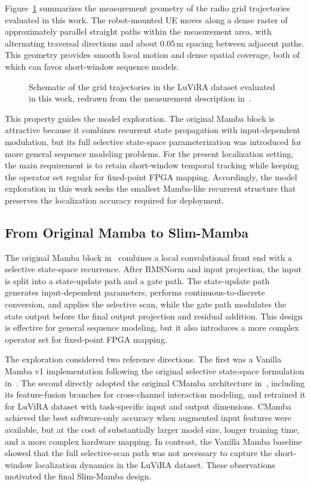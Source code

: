 \documentclass[lettersize,journal]{IEEEtran}
\begin{document}
Figure~\ref{fig:luvira_grid_scenario} summarizes the measurement geometry of
the radio grid trajectories evaluated in this work. The robot-mounted UE moves
along a dense raster of approximately parallel straight paths within the
measurement area, with alternating traversal directions and about 0.05\,m
spacing between adjacent paths. This geometry provides smooth local motion and
dense spatial coverage, both of which can favor short-window sequence models.

\begin{figure}[!t]
  \centering
  
  \caption{Schematic of the grid trajectories in the LuViRA dataset evaluated in this work, redrawn from the measurement description in~\cite{LuViRA2024, Tian2024}.}
  \label{fig:luvira_grid_scenario}
\end{figure}

This property guides the model exploration. The original Mamba block is
attractive because it combines recurrent state propagation with input-dependent modulation, but its full selective state-space parameterization was introduced for more general sequence modeling problems. For the present localization setting, the main requirement is to retain short-window temporal tracking while keeping the operator set regular for fixed-point FPGA mapping. Accordingly, the model exploration in this work seeks the smallest Mamba-like recurrent structure that preserves the localization accuracy required for deployment.

\subsection{From Original Mamba to Slim-Mamba}

The original Mamba block in~\cite{Mamba2023} combines a local convolutional
front end with a selective state-space recurrence. After RMSNorm and input
projection, the input is split into a state-update path and a gate path. The
state-update path generates input-dependent parameters, performs
continuous-to-discrete conversion, and applies the selective scan, while the
gate path modulates the state output before the final output projection and
residual addition. This design is effective for general sequence modeling, but
it also introduces a more complex operator set for fixed-point FPGA mapping.

The exploration considered two reference directions. The first was a Vanilla
Mamba v1 implementation following the original selective state-space formulation
in~\cite{Mamba2023}. The second directly adopted the original CMamba
architecture in~\cite{zeng2024cmamba}, including its feature-fusion branches
for cross-channel interaction modeling, and retrained it for LuViRA
dataset with task-specific input and output dimensions. CMamba achieved
the best software-only accuracy when augmented input features were available,
but at the cost of substantially larger model size, longer training time, and a
more complex hardware mapping. In contrast, the Vanilla Mamba baseline showed
that the full selective-scan path was not necessary to capture the short-window
localization dynamics in the LuViRA dataset. These observations motivated the final
Slim-Mamba design.
\end{document}
